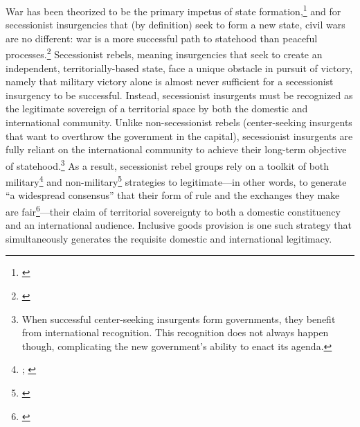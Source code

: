 \documentclass[12pt, letterpaper]{article}
\begin{document}
War has been theorized to be the primary impetus of state formation,\footnote{\citealt{tilly1978mobilization,tilly1992coercion}} and for secessionist insurgencies that (by definition) seek to form a new state, civil wars are no different: war is a more successful path to statehood than peaceful processes.\footnote{\citealt{coggins2011friends}} Secessionist rebels, meaning insurgencies that seek to create an independent, territorially-based state, face a unique obstacle in pursuit of victory, namely that military victory alone is almost never sufficient for a secessionist insurgency to be successful. Instead, secessionist insurgents must be recognized as the legitimate sovereign of a territorial space by both the domestic and international community. Unlike non-secessionist rebels (center-seeking insurgents that want to overthrow the government in the capital), secessionist insurgents are fully reliant on the international community to achieve their long-term objective of statehood.\footnote{When successful center-seeking insurgents form governments, they benefit from international recognition. This recognition does not always happen though, complicating the new government's ability to enact its agenda.} As a result, secessionist rebel groups rely on a toolkit of both military\footnote{\citealt{fazal2013secessionism}; \citealt{lasley2014secession}} and non-military\footnote{\citealt{jo2015compliant}} strategies to legitimate---in other words, to generate ``a widespread consensus'' that their form of rule and the exchanges they make are fair\footnote{\citealt[13-4]{wimmer2012waves}}---their claim of territorial sovereignty to both a domestic constituency and an international audience. Inclusive goods provision is one such strategy that simultaneously generates the requisite domestic and international legitimacy. 
\end{document}
